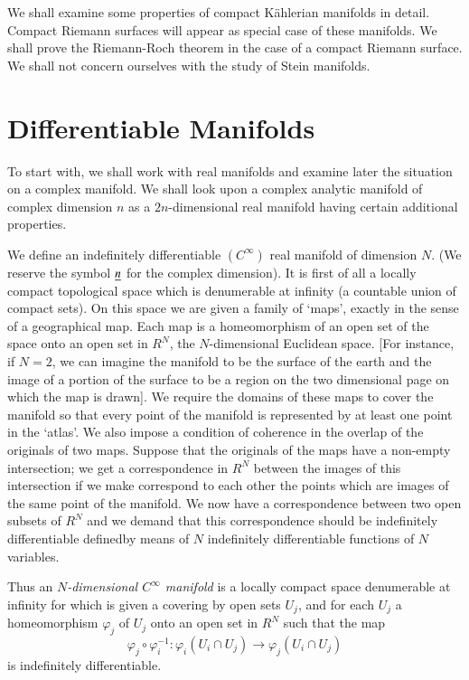 We shall examine some properties of compact K\"ahlerian manifolds in
detail. Compact Riemann surfaces will appear as special case of these
manifolds. We shall prove the Riemann-Roch theorem in the case of a
compact Riemann surface. We shall not concern ourselves with the study
of Stein manifolds.

\section*{Differentiable Manifolds}\pageoriginale

To start with, we shall work with real manifolds and examine later the
situation on a complex manifold. We shall look upon a complex analytic
manifold of complex dimension $n$ as a $2n$-dimensional real manifold
having certain additional properties.

We define an indefinitely differentiable $(C^{\infty})$ real manifold
of dimension $N$. (We reserve the symbol $\underline{n}$ for the complex
dimension). It is first of all a locally compact topological space
which is denumerable at infinity (\iec a countable union of compact
sets). On this space we are given a family of `maps', exactly in the
sense of a geographical map. Each map is a homeomorphism of an open
set of the space onto an open set in $R^{N}$, the $N$-dimensional
Euclidean space. [For instance, if $N=2$, we can imagine the manifold
  to be the surface of the earth and the image of a portion of the
  surface to be a region on the two dimensional page on which the map
  is drawn]. We require the domains of these maps to cover the
manifold so that every point of the manifold is represented by at
least one point in the `atlas'. We also impose a condition of
coherence in the overlap of the originals of two maps. Suppose that
the originals of the maps have a non-empty intersection; we get a
correspondence in $R^{N}$ between the images of this intersection if
we make correspond to each other the points which are images of the
same point of the manifold. We now have a correspondence between two
open subsets of $R^{N}$ and we demand that this correspondence should
be indefinitely differentiable \iec defined\pageoriginale by means of
$N$ indefinitely differentiable functions of $N$ variables.

Thus an {\em $N$-dimensional $C^{\infty}$ manifold} is a locally
compact space denumerable at infinity for which is given a covering by
open sets $U_{j}$, and for each $U_{j}$ a homeomorphism $\varphi_{j}$
of $U_{j}$ onto an open set in $R^{N}$ such that the map
$$
\varphi_{j}\circ \varphi^{-1}_{i}:\varphi_{i}(U_{i}\cap U_{j})\to
\varphi_{j}(U_{i}\cap U_{j}) 
$$
is indefinitely differentiable.


